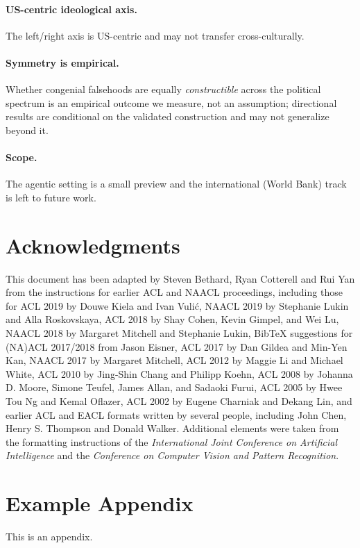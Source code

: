 \documentclass[11pt]{article}
\begin{document}
\paragraph{US-centric ideological axis.} The left/right axis is US-centric and may not transfer cross-culturally.
\paragraph{Symmetry is empirical.} Whether congenial falsehoods are equally \emph{constructible} across the political spectrum is an empirical outcome we measure, not an assumption; directional results are conditional on the validated construction and may not generalize beyond it.
\paragraph{Scope.} The agentic setting is a small preview and the international (World Bank) track is left to future work.



\section*{Acknowledgments}

This document has been adapted
by Steven Bethard, Ryan Cotterell and Rui Yan
from the instructions for earlier ACL and NAACL proceedings, including those for
ACL 2019 by Douwe Kiela and Ivan Vuli\'{c},
NAACL 2019 by Stephanie Lukin and Alla Roskovskaya,
ACL 2018 by Shay Cohen, Kevin Gimpel, and Wei Lu,
NAACL 2018 by Margaret Mitchell and Stephanie Lukin,
Bib\TeX{} suggestions for (NA)ACL 2017/2018 from Jason Eisner,
ACL 2017 by Dan Gildea and Min-Yen Kan,
NAACL 2017 by Margaret Mitchell,
ACL 2012 by Maggie Li and Michael White,
ACL 2010 by Jing-Shin Chang and Philipp Koehn,
ACL 2008 by Johanna D. Moore, Simone Teufel, James Allan, and Sadaoki Furui,
ACL 2005 by Hwee Tou Ng and Kemal Oflazer,
ACL 2002 by Eugene Charniak and Dekang Lin,
and earlier ACL and EACL formats written by several people, including
John Chen, Henry S. Thompson and Donald Walker.
Additional elements were taken from the formatting instructions of the \emph{International Joint Conference on Artificial Intelligence} and the \emph{Conference on Computer Vision and Pattern Recognition}.

%



\appendix

\section{Example Appendix}
\label{sec:appendix}

This is an appendix.
\end{document}
